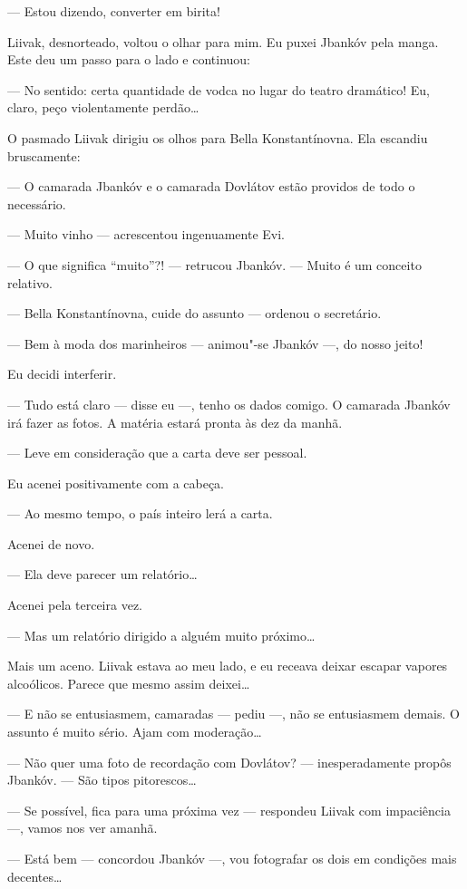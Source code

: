 --- Estou dizendo, converter em birita!

Liivak, desnorteado, voltou o olhar para mim. Eu puxei Jbankóv pela
manga. Este deu um passo para o lado e continuou:

--- No sentido: certa quantidade de vodca no lugar do teatro
dramático! Eu, claro, peço violentamente perdão\ldots{}

O pasmado Liivak dirigiu os olhos para Bella Konstantínovna. Ela
escandiu bruscamente:

--- O camarada Jbankóv e o camarada Dovlátov estão providos de
todo o necessário.

--- Muito vinho --- acrescentou ingenuamente Evi.

--- O que significa ``muito''?! --- retrucou Jbankóv.
--- Muito é um conceito relativo.

--- Bella Konstantínovna, cuide do assunto --- ordenou o
secretário.

--- Bem à moda dos marinheiros --- animou"-se Jbankóv ---, do nosso jeito!

Eu decidi interferir.

--- Tudo está claro --- disse eu ---, tenho os
dados comigo. O camarada Jbankóv irá fazer as fotos. A matéria estará
pronta às dez da manhã.

--- Leve em consideração que a carta deve ser pessoal.

Eu acenei positivamente com a cabeça.

--- Ao mesmo tempo, o país inteiro lerá a carta.

Acenei de novo.

--- Ela deve parecer um relatório\ldots{}

Acenei pela terceira vez.

--- Mas um relatório dirigido a alguém muito próximo\ldots{}

Mais um aceno. Liivak estava ao meu lado, e eu receava deixar escapar
vapores alcoólicos. Parece que mesmo assim deixei\ldots{}

--- E não se entusiasmem, camaradas --- pediu ---,
não se entusiasmem demais. O assunto é muito sério. Ajam com
moderação\ldots{}

--- Não quer uma foto de recordação com Dovlátov? ---
inesperadamente propôs Jbankóv. --- São tipos pitorescos\ldots{}

--- Se possível, fica para uma próxima vez --- respondeu
Liivak com impaciência ---, vamos nos ver amanhã.

--- Está bem --- concordou Jbankóv ---, vou
fotografar os dois em condições mais decentes\ldots{}

